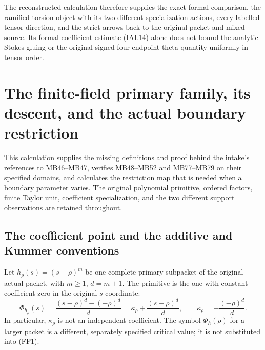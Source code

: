 \documentclass[11pt,a4paper]{article}
\theoremstyle{definition}
\begin{document}
The reconstructed calculation therefore supplies the exact formal
comparison, the ramified torsion object with its two different
specialization actions, every labelled tensor direction, and the
strict arrows back to the original packet and mixed source.  Its
formal coefficient estimate (IAL14) alone does not bound the
analytic Stokes gluing or the original signed four-endpoint theta
quantity uniformly in tensor order.



\section{The finite-field primary family, its descent, and the actual boundary restriction}

This calculation supplies the missing definitions and proof behind the
intake's references to MB46--MB47, verifies MB48--MB52 and MB77--MB79
on their specified domains, and calculates the restriction map that is
needed when a boundary parameter varies.  The original polynomial
primitive, ordered factors, finite Taylor unit, coefficient specialization,
and the two different support observations are retained throughout.

\subsection{The coefficient point and the additive and Kummer conventions}

Let \(h_\rho(s)=(s-\rho)^m\) be one complete primary subpacket of the
original actual packet, with \(m\geq1\), \(d=m+1\).  The primitive is the
one with constant coefficient zero in the original \(s\) coordinate:
\[
 \Phi_{h_\rho}(s)=\frac{(s-\rho)^d-(-\rho)^d}{d}
 =\kappa_\rho+\frac{(s-\rho)^d}{d},
 \qquad \kappa_\rho=-\frac{(-\rho)^d}{d}.                 \tag{FF1}
\]
In particular, \(\kappa_\rho\) is not an independent coefficient.  The
symbol \(\Phi_h(\rho)\) for a larger packet is a different, separately
specified critical value; it is not substituted into (FF1).
\end{document}
